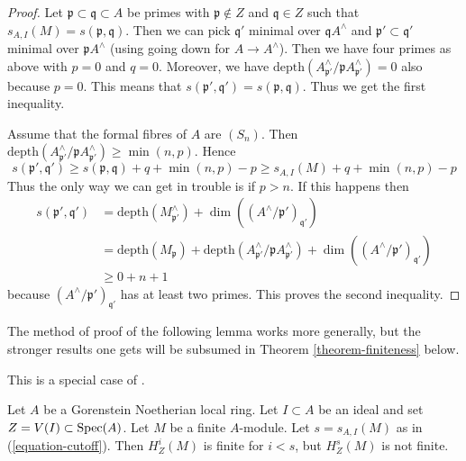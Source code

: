 \begin{proof}
\medskip\noindent
Let $\mathfrak p \subset \mathfrak q \subset A$ be primes
with $\mathfrak p \not \in Z$ and $\mathfrak q \in Z$ such that
$s_{A, I}(M) = s(\mathfrak p, \mathfrak q)$.
Then we can pick $\mathfrak q'$ minimal over $\mathfrak q A^\wedge$
and $\mathfrak p' \subset \mathfrak q'$ minimal over
$\mathfrak p A^\wedge$ (using going down for $A \to A^\wedge$).
Then we have four primes as above with $p = 0$ and $q = 0$.
Moreover, we have
$\text{depth}(A^\wedge_{\mathfrak p'} / \mathfrak p A^\wedge_{\mathfrak p'})=0$
also because $p = 0$. This means that
$s(\mathfrak p', \mathfrak q') = s(\mathfrak p, \mathfrak q)$.
Thus we get the first inequality.

\medskip\noindent
Assume that the formal fibres of $A$ are $(S_n)$. Then
$\text{depth}(A^\wedge_{\mathfrak p'} / \mathfrak p A^\wedge_{\mathfrak p'})
\geq \min(n, p)$.
Hence
$$
s(\mathfrak p', \mathfrak q') \geq
s(\mathfrak p, \mathfrak q) + q + \min(n, p) - p \geq
s_{A, I}(M) + q + \min(n, p) - p
$$
Thus the only way we can get in trouble is if $p > n$. If this happens
then
\begin{align*}
s(\mathfrak p', \mathfrak q')
& =
\text{depth}(M^\wedge_{\mathfrak p'}) +
\dim((A^\wedge/\mathfrak p')_{\mathfrak q'}) \\
& =
\text{depth}(M_\mathfrak p) +
\text{depth}(A^\wedge_{\mathfrak p'} / \mathfrak p A^\wedge_{\mathfrak p'}) +
\dim((A^\wedge/\mathfrak p')_{\mathfrak q'}) \\
& \geq
0 + n + 1
\end{align*}
because $(A^\wedge/\mathfrak p')_{\mathfrak q'}$ has at least two primes.
This proves the second inequality.
\end{proof}

\noindent
The method of proof of the following lemma works more generally,
but the stronger results one gets will be subsumed in
Theorem \ref{theorem-finiteness} below.

\begin{lemma}
\label{lemma-local-annihilator}
\begin{reference}
This is a special case of
\cite[Satz 1]{Faltings-annulators}.
\end{reference}
Let $A$ be a Gorenstein Noetherian local ring. Let $I \subset A$
be an ideal and set $Z = V(I) \subset \mathop{\mathrm{Spec}}(A)$.
Let $M$ be a finite $A$-module. Let $s = s_{A, I}(M)$ as in
(\ref{equation-cutoff}). Then $H^i_Z(M)$ is finite for $i < s$,
but $H^s_Z(M)$ is not finite.
\end{lemma}

